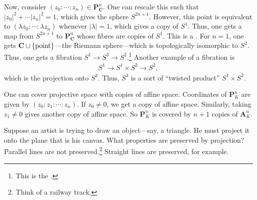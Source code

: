 \documentclass [11 pt, oneside] {article}
\begin{document}
Now, consider $(z_0:\cdots : z_n)\in \mathbf{P}^n_{\mathbf{C}}$. One can rescale this such that $\left\lvert z_0 \right\rvert ^2 + \cdots \left\lvert z_n \right\rvert ^2 = 1$, which gives the sphere $S^{2n+1}$. However, this point is equivalent to $(\lambda z_0:\cdots:\lambda z_n)$ whenever $\left\lvert \lambda \right\rvert =1$, which gives a copy of $S^1$. Thus, one gets a map from $S^{2n+1}$ to $\mathbf{P}^n_{\mathbf{C}}$ whose fibres are copies of $S^1$. This is a . For $n=1$, one gets $\mathbf C \cup \{ \textrm{point}\}$---the Riemann sphere---which is topologically isomorphic to $S^2$. Thus, one gets a fibration $S^1 \longrightarrow S^3 \longrightarrow S^2$.\footnote{This is the .} Another example of a fibration is 
\begin{align*}
	S^1 \longrightarrow S^1\times S^2 \longrightarrow S^2,
\end{align*}
which is the projection onto $S^2$. Thus, $S^3$ is a sort of ``twisted product'' $S^1\times S^2$.


One can cover projective space with copies of affine space. Coordinates of $\mathbf{P}^n_K$ are given by $(z_0:z_1:\cdots : z_n)$. If $z_0\ne 0$, we get a copy of affine space. Similarly, taking $z_1\ne 0$ gives another copy of affine space. So $\mathbf{P}^n_K$ is covered by $n+1$ copies of $\mathbf{A}^n_K$.

Suppose an artist is trying to draw an object---say, a triangle. He must project it onto the plane that is his canvas. What properties are preserved by projection? Parallel lines are not preserved.\footnote{Think of a railway track.} Straight lines are preserved, for example.
\end{document}
